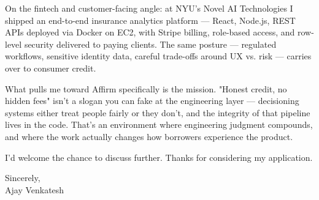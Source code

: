 \documentclass[letterpaper,11pt]{article}
\begin{document}
On the fintech and customer-facing angle: at NYU's Novel AI Technologies I shipped an end-to-end insurance analytics platform --- React, Node.js, REST APIs deployed via Docker on EC2, with Stripe billing, role-based access, and row-level security delivered to paying clients. The same posture --- regulated workflows, sensitive identity data, careful trade-offs around UX vs. risk --- carries over to consumer credit.

What pulls me toward Affirm specifically is the mission. "Honest credit, no hidden fees" isn't a slogan you can fake at the engineering layer --- decisioning systems either treat people fairly or they don't, and the integrity of that pipeline lives in the code. That's an environment where engineering judgment compounds, and where the work actually changes how borrowers experience the product.

I'd welcome the chance to discuss further. Thanks for considering my application.

\vspace{12pt}

Sincerely, \\
Ajay Venkatesh
\end{document}
